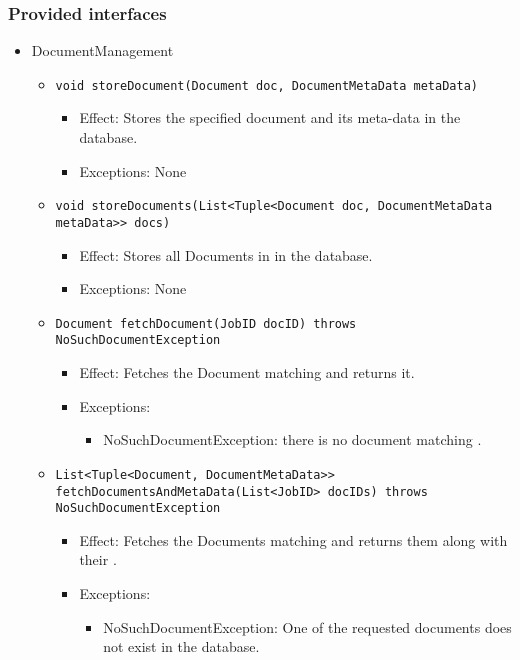 \subsubsection*{Provided interfaces}
\begin{itemize}
    \item DocumentManagement
	\begin{itemize}
		\item \texttt{void storeDocument(Document doc, DocumentMetaData metaData)}
		\begin{itemize}
			\item Effect: Stores the specified document and its meta-data in the database.
			\item Exceptions: None
		\end{itemize}

		\item \texttt{void storeDocuments(List<Tuple<Document doc, DocumentMetaData metaData>> docs)}
		\begin{itemize}
			\item Effect: Stores all Documents in  in the database.
			\item Exceptions: None
		\end{itemize}
		
		\item \texttt{Document fetchDocument(JobID docID) throws NoSuchDocumentException}
		\begin{itemize}
			\item Effect: Fetches the Document matching  and returns it.
			\item Exceptions: 
			\begin{itemize}
				\item NoSuchDocumentException: there is no document matching .
			\end{itemize}
		\end{itemize}

		\item \texttt{List<Tuple<Document, DocumentMetaData>> fetchDocumentsAndMetaData(List<JobID> docIDs) throws NoSuchDocumentException}
		\begin{itemize}
			\item Effect: Fetches the Documents matching  and returns them along with their .
			\item Exceptions: 
			\begin{itemize}
				\item NoSuchDocumentException: One of the requested documents does not exist in the database.
			\end{itemize}
		\end{itemize}


\end{itemize}
\end{itemize}
